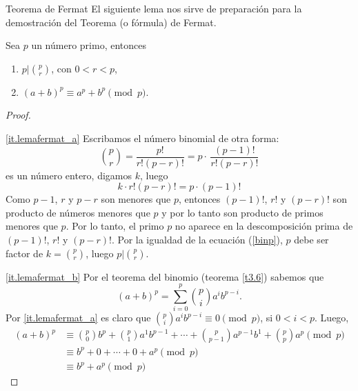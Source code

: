 \begin{section}{Teorema de Fermat}\label{seccion-teorema-de-fermat} 
El siguiente lema nos sirve de preparación para la demostración
del Teorema (o fórmula) de Fermat.

\begin{lema} \label{l4.3} Sea $p$ un número primo, entonces
\begin{enumerate}[label=\textit{\alph*)}]
\item\label{it.lemafermat_a}  $p|\displaystyle\binom{p}{r}$, con $0< r <p$,
\item\label{it.lemafermat_b}  $(a+b)^p \equiv a^p+b^p \pmod{p}$.
\end{enumerate}
\end{lema}
\begin{proof}
    \
    
    \ref{it.lemafermat_a} Escribamos el número binomial de otra forma: 
$$
\binom{p}{r}=\frac{p!}{r!(p-r)!}=p\cdot\,\frac{(p-1)!}{r!(p-r)!}
$$ 
es un número entero, digamos $k$, luego 
\begin{equation}\label{binp}
k \cdot r!(p-r)! = p \cdot(p-1)!
\end{equation}
Como $p-1$, $r$ y $p-r$ son menores que $p$, entonces  $(p-1)!$, $r!$ y $(p-r)!$ son producto de números menores que $p$ y por lo tanto son producto de primos menores que $p$. 
Por lo tanto, el primo $p$ no aparece en la descomposición prima de $(p-1)!$, $r!$ y $(p-r)!$. Por la igualdad de la ecuación (\ref{binp}), $p$ debe ser factor de $k = \binom{p}{r}$, luego $p|\binom{p}{r}$.

\ref{it.lemafermat_b} Por el teorema del binomio (teorema \ref{t3.6}) sabemos que
\begin{equation*}
    (a+b)^p =\sum_{i=0}^{p} \binom{p}{i} a^ib^{p-i}.
\end{equation*}
Por \ref{it.lemafermat_a} es claro que $ \binom{p}{i} a^ib^{p-i}\equiv 0 \pmod{p}$,
si $0<i<p$. Luego,
\begin{align*}
    (a+b)^p &\equiv {\scriptstyle \binom{p}{0}} b^{p}+ {\scriptstyle \binom{p}{1}} a^1b^{p-1} + \cdots +{\scriptstyle \binom{p}{p-1}} a^{p-1}b^{1}+ {\scriptstyle \binom{p}{p}} a^p \pmod{p} \\
    &\equiv b^{p}+ 0 + \cdots +0 + a^p \pmod{p} \\
    &\equiv b^{p}+  a^p \pmod{p} 
\end{align*}

\end{proof}


\end{section}
